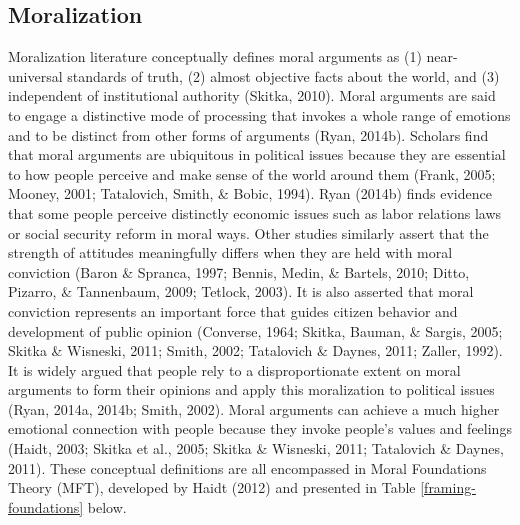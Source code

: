 \documentclass[12pt,econ]{sources/authesis}
\begin{document}
\hypertarget{framing-theory-moralization}{%
\subsection{Moralization}\label{framing-theory-moralization}}

Moralization literature conceptually defines moral arguments as (1) near-universal standards of truth, (2) almost objective facts about the world, and (3) independent of institutional authority (Skitka, 2010). Moral arguments are said to engage a distinctive mode of processing that invokes a whole range of emotions and to be distinct from other forms of arguments (Ryan, 2014b). Scholars find that moral arguments are ubiquitous in political issues because they are essential to how people perceive and make sense of the world around them (Frank, 2005; Mooney, 2001; Tatalovich, Smith, \& Bobic, 1994). Ryan (2014b) finds evidence that some people perceive distinctly economic issues such as labor relations laws or social security reform in moral ways. Other studies similarly assert that the strength of attitudes meaningfully differs when they are held with moral conviction (Baron \& Spranca, 1997; Bennis, Medin, \& Bartels, 2010; Ditto, Pizarro, \& Tannenbaum, 2009; Tetlock, 2003). It is also asserted that moral conviction represents an important force that guides citizen behavior and development of public opinion (Converse, 1964; Skitka, Bauman, \& Sargis, 2005; Skitka \& Wisneski, 2011; Smith, 2002; Tatalovich \& Daynes, 2011; Zaller, 1992). It is widely argued that people rely to a disproportionate extent on moral arguments to form their opinions and apply this moralization to political issues (Ryan, 2014a, 2014b; Smith, 2002). Moral arguments can achieve a much higher emotional connection with people because they invoke people's values and feelings (Haidt, 2003; Skitka et al., 2005; Skitka \& Wisneski, 2011; Tatalovich \& Daynes, 2011). These conceptual definitions are all encompassed in Moral Foundations Theory (MFT), developed by Haidt (2012) and presented in Table \ref{framing-foundations} below.
\end{document}
